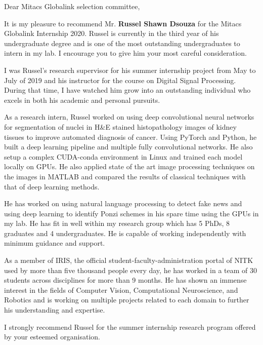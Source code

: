 \documentclass[12pt]{article}
\begin{document}
\noindent
Dear Mitacs Globalink selection committee,

\bigskip
\noindent
It is my pleasure to recommend Mr. \textbf{Russel Shawn Dsouza} for the Mitacs Globalink Internship 2020. Russel is currently in the third year of his undergraduate degree and is one of the most outstanding undergraduates to intern in my lab. I encourage you to give him your most careful consideration.

\medskip
\noindent
I was Russel's research supervisor for his summer internship project from May to July of 2019 and his instructor for the course on Digital Signal Processing.
During that time, I have watched him grow into an outstanding individual who excels in both his academic and personal pursuits.

\medskip
\noindent
As a research intern, Russel worked on using deep convolutional neural networks for segmentation of nuclei in H\&E stained histopathology images of kidney tissues to improve automated diagnosis of cancer.
Using PyTorch and Python, he built a deep learning pipeline and multiple fully convolutional networks. He also setup a complex CUDA-conda environment in Linux and trained each model locally on GPUs.
He also applied state of the art image processing techniques on the images in MATLAB and compared the results of classical techniques with that of deep learning methods.

\medskip
\noindent
He has worked on using natural language processing to detect fake news and using deep learning to identify Ponzi schemes in his spare time using the GPUs in my lab.
He has fit in well within my research group which has 5 PhDs, 8 graduates and 4 undergraduates.
He is capable of working independently with minimum guidance and support. 

\medskip
\noindent
As a member of IRIS, the official student-faculty-administration portal of NITK used by more than five thousand people every day, he has worked in a team of 30 students across disciplines for more than 9 months.
He has shown an immense interest in the fields of Computer Vision, Computational Neuroscience, and Robotics and is working on multiple projects related to each domain to further his understanding and expertise.

\medskip
\noindent
I strongly recommend Russel for the summer internship research program offered by your esteemed organisation. %
\end{document}
